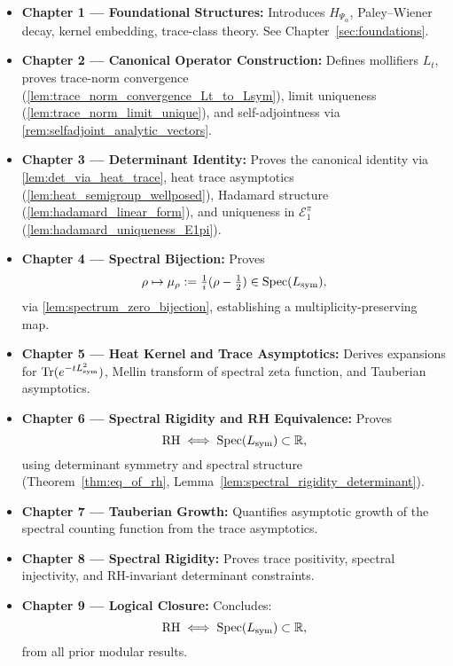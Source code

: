 \begin{itemize}
  \item \textbf{Chapter 1 — Foundational Structures:}  
  Introduces \( H_{\Psi_\alpha} \), Paley--Wiener decay, kernel embedding, trace-class theory. See Chapter~\ref{sec:foundations}.

  \item \textbf{Chapter 2 — Canonical Operator Construction:}  
  Defines mollifiers \( L_t \), proves trace-norm convergence (\cref{lem:trace_norm_convergence_Lt_to_Lsym}), limit uniqueness (\cref{lem:trace_norm_limit_unique}), and self-adjointness via \cref{rem:selfadjoint_analytic_vectors}.

  \item \textbf{Chapter 3 — Determinant Identity:}  
  Proves the canonical identity via \cref{lem:det_via_heat_trace}, heat trace asymptotics (\cref{lem:heat_semigroup_wellposed}), Hadamard structure (\cref{lem:hadamard_linear_form}), and uniqueness in \( \mathcal{E}_1^\pi \) (\cref{lem:hadamard_uniqueness_E1pi}).

  \item \textbf{Chapter 4 — Spectral Bijection:}  
  Proves
  \[
  \rho \mapsto \mu_\rho := \tfrac{1}{i}(\rho - \tfrac{1}{2}) \in \operatorname{Spec}(L_{\mathrm{sym}}),
  \]
  via \cref{lem:spectrum_zero_bijection}, establishing a multiplicity-preserving map.

  \item \textbf{Chapter 5 — Heat Kernel and Trace Asymptotics:}  
  Derives expansions for \( \operatorname{Tr}(e^{-tL_{\mathrm{sym}}^2}) \), Mellin transform of spectral zeta function, and Tauberian asymptotics.

  \item \textbf{Chapter 6 — Spectral Rigidity and RH Equivalence:}  
  Proves
  \[
  \text{RH} \iff \operatorname{Spec}(L_{\mathrm{sym}}) \subset \mathbb{R},
  \]
  using determinant symmetry and spectral structure (Theorem~\ref{thm:eq_of_rh}, Lemma~\ref{lem:spectral_rigidity_determinant}).

  \item \textbf{Chapter 7 — Tauberian Growth:}  
  Quantifies asymptotic growth of the spectral counting function from the trace asymptotics.

  \item \textbf{Chapter 8 — Spectral Rigidity:}  
  Proves trace positivity, spectral injectivity, and RH-invariant determinant constraints.

  \item \textbf{Chapter 9 — Logical Closure:}  
  Concludes:
  \[
  \text{RH} \iff \operatorname{Spec}(L_{\mathrm{sym}}) \subset \mathbb{R},
  \]
  from all prior modular results.
\end{itemize}

